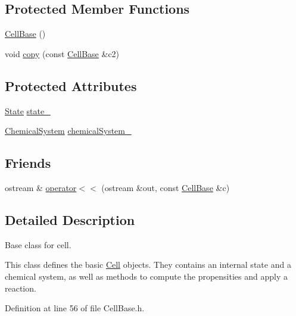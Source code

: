 \subsection*{\-Protected \-Member \-Functions}
\begin{DoxyCompactItemize}
\item 
\hyperlink{class_cell_base_ac5cbc18d3f767bb91d9e052a3eb778b5}{\-Cell\-Base} ()
\item 
void \hyperlink{class_cell_base_a614fb1ef7fdd9ff936bfb941736a2fb8}{copy} (const \hyperlink{class_cell_base}{\-Cell\-Base} \&c2)
\end{DoxyCompactItemize}
\subsection*{\-Protected \-Attributes}
\begin{DoxyCompactItemize}
\item 
\hyperlink{class_state}{\-State} \hyperlink{class_cell_base_a966e4298cabc00986bb03ce92dfad1f5}{state\-\_\-}
\item 
\hyperlink{class_chemical_system}{\-Chemical\-System} \hyperlink{class_cell_base_ad40c4890431f5857c449a6470f80d15c}{chemical\-System\-\_\-}
\end{DoxyCompactItemize}
\subsection*{\-Friends}
\begin{DoxyCompactItemize}
\item 
ostream \& \hyperlink{class_cell_base_ad3061d9b136ee7884ff7c255a977fd78}{operator$<$$<$} (ostream \&out, const \hyperlink{class_cell_base}{\-Cell\-Base} \&c)
\end{DoxyCompactItemize}


\subsection{\-Detailed \-Description}
\-Base class for cell.

\-This class defines the basic \hyperlink{class_cell}{\-Cell} objects. \-They contains an internal state and a chemical system, as well as methods to compute the propensities and apply a reaction. 

\-Definition at line 56 of file \-Cell\-Base.\-h.



